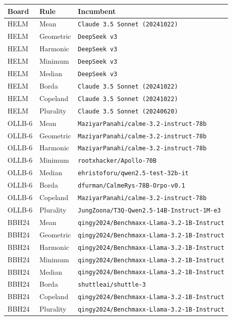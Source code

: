 \begin{tabular}{llp{9.5cm}}\toprule
Board & Rule & Incumbent\\\midrule
HELM & Mean & \texttt{Claude 3.5 Sonnet (20241022)}\\
HELM & Geometric & \texttt{DeepSeek v3}\\
HELM & Harmonic & \texttt{DeepSeek v3}\\
HELM & Minimum & \texttt{DeepSeek v3}\\
HELM & Median & \texttt{DeepSeek v3}\\
HELM & Borda & \texttt{Claude 3.5 Sonnet (20241022)}\\
HELM & Copeland & \texttt{Claude 3.5 Sonnet (20241022)}\\
HELM & Plurality & \texttt{Claude 3.5 Sonnet (20240620)}\\
\midrule
OLLB-6 & Mean & \texttt{MaziyarPanahi/calme-3.2-instruct-78b}\\
OLLB-6 & Geometric & \texttt{MaziyarPanahi/calme-3.2-instruct-78b}\\
OLLB-6 & Harmonic & \texttt{MaziyarPanahi/calme-3.2-instruct-78b}\\
OLLB-6 & Minimum & \texttt{rootxhacker/Apollo-70B}\\
OLLB-6 & Median & \texttt{ehristoforu/qwen2.5-test-32b-it}\\
OLLB-6 & Borda & \texttt{dfurman/CalmeRys-78B-Orpo-v0.1}\\
OLLB-6 & Copeland & \texttt{MaziyarPanahi/calme-3.2-instruct-78b}\\
OLLB-6 & Plurality & \texttt{JungZoona/T3Q-Qwen2.5-14B-Instruct-1M-e3}\\
\midrule
BBH24 & Mean & \texttt{qingy2024/Benchmaxx-Llama-3.2-1B-Instruct}\\
BBH24 & Geometric & \texttt{qingy2024/Benchmaxx-Llama-3.2-1B-Instruct}\\
BBH24 & Harmonic & \texttt{qingy2024/Benchmaxx-Llama-3.2-1B-Instruct}\\
BBH24 & Minimum & \texttt{qingy2024/Benchmaxx-Llama-3.2-1B-Instruct}\\
BBH24 & Median & \texttt{qingy2024/Benchmaxx-Llama-3.2-1B-Instruct}\\
BBH24 & Borda & \texttt{shuttleai/shuttle-3}\\
BBH24 & Copeland & \texttt{qingy2024/Benchmaxx-Llama-3.2-1B-Instruct}\\
BBH24 & Plurality & \texttt{qingy2024/Benchmaxx-Llama-3.2-1B-Instruct}\\
\midrule
\bottomrule\end{tabular}
